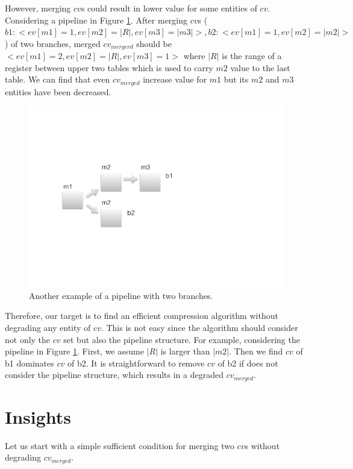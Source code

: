 \documentclass{article}
\begin{document}
However, merging $cv$s could result in lower value for some entities of $cv$. Considering a pipeline in Figure \ref{fig:problem2}. After merging $cv$s ($b1: <ev[m1] = 1, ev[m2] = |R|, ev[m3] = |m3|>, b2: <ev[m1] = 1, ev[m2] = |m2|>$) of two branches, merged $cv_{mergerd}$ should be $<ev[m1] = 2, ev[m2] = |R|, ev[m3] = 1>$ where $|R|$ is the range of a register between upper two tables which is used to carry $m2$ value to the last table. We can find that even $cv_{merged}$ increase value for $m1$ but its $m2$ and $m3$ entities have been decreased.

\begin{figure}
  \includegraphics[width=\linewidth]{figures/problem2.pdf}
  \caption{Another example of a pipeline with two branches.}
  \label{fig:problem2}
\end{figure}

Therefore, our target is to find an efficient compression algorithm without degrading any entity of $cv$. This is not easy since the algorithm should consider not only the $cv$ set but also the pipeline structure. For example, considering the pipeline in Figure \ref{fig:problem2}. First, we assume $|R|$ is larger than $|m2|$. Then we find $cv$ of b1 dominates $cv$ of b2. It is straightforward to remove $cv$ of b2 if does not consider the pipeline structure, which results in a degraded $cv_{merged}$.

\section{Insights}

Let us start with a simple sufficient condition for merging two $cv$s without degrading $cv_{merged}$.
\end{document}

